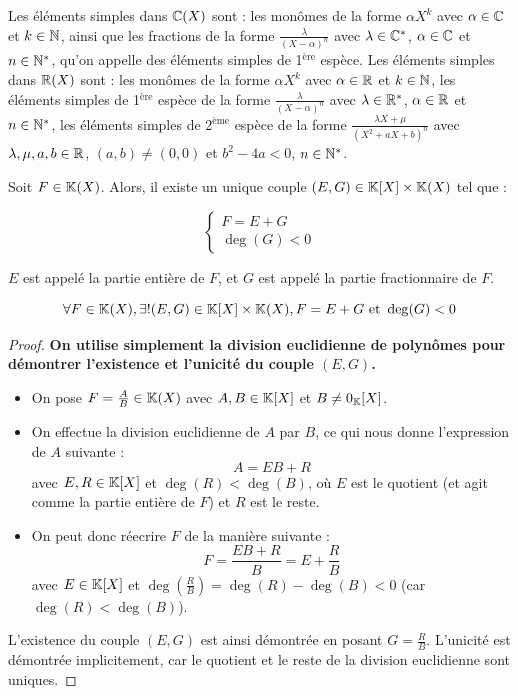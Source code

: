 \documentclass[12pt, a4paper]{report}
\begin{document}
\begin{remark}
    \begin{outline}
        \1 Les éléments simples dans $\mathbb{C}(X)$ sont :
        \2 les monômes de la forme $\alpha X^k$ avec $\alpha \in \mathbb{C}$ et $k \in \mathbb{N}$,
        \2 ainsi que les fractions de la forme $\frac{\lambda}{(X - \alpha)^n}$ avec $\lambda \in \mathbb{C}^*$, $\alpha \in \mathbb{C}$ et $n \in \mathbb{N}^*$, qu'on appelle des éléments simples de 1$^\text{ère}$ espèce.
        \1 Les éléments simples dans $\mathbb{R}(X)$ sont :
        \2 les monômes de la forme $\alpha X^k$ avec $\alpha \in \mathbb{R}$ et $k \in \mathbb{N}$, 
        \2 les éléments simples de 1$^\text{ère}$ espèce de la forme $\frac{\lambda}{(X - \alpha)^n}$ avec $\lambda \in \mathbb{R}^*$, $\alpha \in \mathbb{R}$ et $n \in \mathbb{N}^*$,
        \2 les éléments simples de 2$^\text{ème}$ espèce de la forme $\frac{\lambda X + \mu}{(X^2 + aX + b)^n}$ avec $\lambda, \mu, a, b \in \mathbb{R}$, $(a,b) \ne (0,0)$ et $b^2 - 4a < 0$, $n \in \mathbb{N}^*$.
    \end{outline}
\end{remark}

\begin{property}
    Soit $F \in \mathbb{K}(X)$. Alors, il existe un unique couple $(E, G) \in \mathbb{K}[X] \times \mathbb{K}(X)$ tel que :

    $$\begin{cases}
    F = E + G\\
    \deg(G) < 0
    \end{cases}$$

    $E$ est appelé la partie entière de $F$, et $G$ est appelé la partie fractionnaire de $F$.

    $$\forall F \in \mathbb{K}(X), \exists! (E, G) \in \mathbb{K}[X] \times \mathbb{K}(X), F = E + G \text{ et } \deg(G) < 0$$
\end{property}

\begin{proof}
    \textbf{On utilise simplement la division euclidienne de polynômes pour démontrer l'existence et l'unicité du couple $(E, G)$.}

    \begin{itemize}
        \item On pose $F = \frac AB \in \mathbb{K}(X)$ avec $A, B \in \mathbb{K}[X]$ et $B \neq 0_{\mathbb{K}}[X]$.

        \item On effectue la division euclidienne de $A$ par $B$, ce qui nous donne l'expression de $A$ suivante :
        $$A = EB + R$$
        avec $E, R \in \mathbb{K}[X]$ et $\deg(R) < \deg(B)$, où $E$ est le quotient (et agit comme la partie entière de $F$) et $R$ est le reste.

        \item On peut donc réecrire $F$ de la manière suivante :
        $$F = \frac{EB + R}{B} = E + \frac RB$$
        avec $E \in \mathbb{K}[X]$ et $\deg(\frac RB) = \deg(R) - \deg(B) < 0$ (car $\deg(R) < \deg(B)$).
    \end{itemize}

    L'existence du couple $(E, G)$ est ainsi démontrée en posant $G = \frac RB$. L'unicité est démontrée implicitement, car le quotient et le reste de la division euclidienne sont uniques.
\end{proof}
\end{document}
